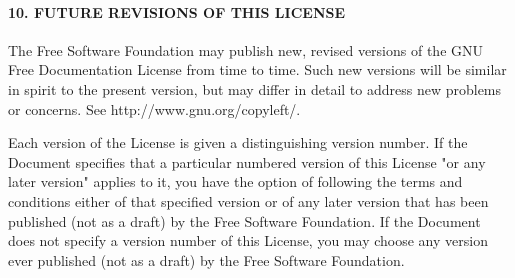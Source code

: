 \begin{multicols}{2}
\paragraph{{\footnotesize 10. FUTURE REVISIONS OF THIS LICENSE}}

{\footnotesize The Free Software Foundation may publish new, revised versions of the GNU Free Documentation License from time to time.  Such new versions will be similar in spirit to the present version, but may differ in detail to address new problems or concerns. See http://www.gnu.org/copyleft/.}{\footnotesize \par}

{\footnotesize Each version of the License is given a distinguishing version number. If the Document specifies that a particular numbered version of this License "or any later version" applies to it, you have the option of following the terms and conditions either of that specified version or of any later version that has been published (not as a draft) by the Free Software Foundation. If the Document does not specify a version number of this License, you may choose any version ever published (not as a draft) by the Free Software Foundation.}{\footnotesize \par}
\end{multicols}
